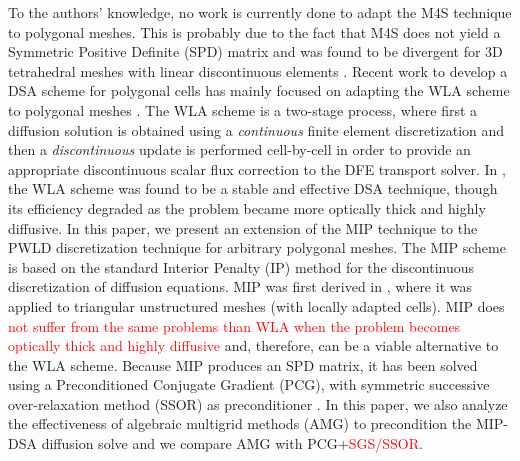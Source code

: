 

To the authors' knowledge, no work is currently done to adapt the M4S 
technique to polygonal meshes. This is probably due to the fact
that M4S does not yield a Symmetric Positive Definite (SPD)
matrix and was found to be divergent for 3D tetrahedral meshes with linear 
discontinuous elements \cite{consistent_p1}. 
% 
Recent work to develop a DSA scheme for polygonal cells has mainly focused 
on adapting the WLA scheme to polygonal meshes
\cite{cfm_dfm,wla_pwl}. The WLA scheme is a two-stage process, where first a
diffusion solution is obtained using a {\em continuous} finite element
discretization and then a {\em discontinuous } update is performed cell-by-cell 
in order to provide an appropriate discontinuous scalar flux correction to the DFE transport 
solver. In \cite{consistent_p1}, the WLA scheme was
found to be a stable and effective DSA technique, though its efficiency
degraded as the problem became more optically thick and highly diffusive.
%
In this paper, we present an extension of the MIP technique to the
PWLD discretization technique for arbitrary polygonal meshes.
The MIP scheme is based on the standard Interior Penalty (IP) method for the
discontinuous discretization of diffusion equations. MIP was first derived in
\cite{mip}, where it was applied to triangular unstructured meshes (with
locally adapted cells). MIP does \textcolor{red}{not suffer from the same problems than WLA when the
problem becomes optically thick and highly diffusive} and, therefore, can be a
viable alternative to the WLA scheme. Because MIP produces an SPD matrix, it has been 
solved using a Preconditioned Conjugate Gradient (PCG), with symmetric successive 
over-relaxation method (SSOR) as preconditioner \cite{mip}. In this paper, we also analyze  
the effectiveness of algebraic multigrid methods (AMG) \cite{amg,amg_course} to precondition 
the MIP-DSA diffusion solve and we compare AMG with PCG+\textcolor{red}{SGS/SSOR}.

